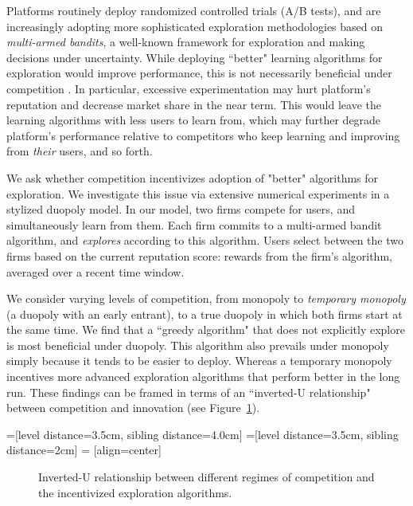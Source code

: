 \documentclass[letterpaper]{article}
\theoremstyle{definition}
\begin{document}
Platforms routinely deploy randomized controlled trials (A/B tests), and are increasingly adopting  more sophisticated exploration methodologies based on \emph{multi-armed bandits}, a well-known framework for exploration and making decisions under uncertainty. While deploying ``better" learning algorithms for exploration would improve performance, this is not necessarily beneficial under competition . In particular, excessive experimentation may hurt platform's reputation and decrease market share in the near term. This would leave the learning algorithms with less users to learn from, which may further degrade platform's performance relative to competitors who keep learning and improving from \emph{their} users, and so forth.

We ask whether competition incentivizes adoption of "better" algorithms for exploration. We investigate this issue via extensive numerical experiments in a stylized duopoly model. In our model, two firms compete for users, and simultaneously learn from them. Each firm commits to a multi-armed bandit algorithm, and \emph{explores} according to this algorithm. Users select between the two firms based on the current reputation score: rewards from the firm's algorithm, averaged over a recent time window. 


We consider varying levels of competition, from monopoly to \emph{temporary monopoly} (a duopoly with an early entrant), to a true duopoly in which both firms start at the same time. We find that a ``greedy algorithm" that does not explicitly explore is most beneficial under duopoly. This algorithm also prevails under monopoly simply because it tends to be easier to deploy. Whereas a temporary monopoly incentives more advanced exploration algorithms that perform better in the long run. These findings can be framed in terms of an ``inverted-U relationship" between competition and innovation (see Figure~\ref{fig:inverted-U}).

=[level distance=3.5cm, sibling distance=4.0cm]
=[level distance=3.5cm, sibling distance=2cm]
 = [align=center]

\begin{figure}
\begin{center}
 \caption{Inverted-U relationship between different regimes of
   competition and the incentivized exploration algorithms.}
\label{fig:inverted-U}
\end{center}
\end{figure}
\end{document}
